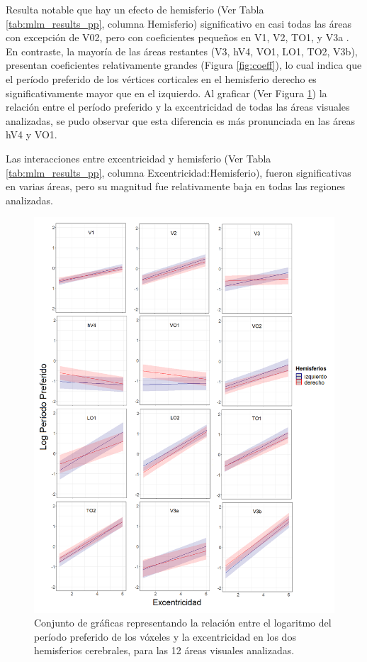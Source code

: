 Resulta notable que hay un efecto de hemisferio (Ver Tabla \ref{tab:mlm_results_pp}, columna Hemisferio) significativo en casi todas las áreas con excepción de V02, pero con coeficientes pequeños en V1, V2, TO1, y V3a . En contraste, la mayor\'ia de las \'areas restantes (V3, hV4, VO1, LO1, TO2, V3b), presentan coeficientes relativamente grandes (Figura \ref{fig:coeff}), lo cual indica que  el per\'iodo preferido de los v\'ertices corticales en el hemisferio derecho es significativamente mayor que en el izquierdo. Al graficar (Ver Figura \ref{fig:hem}) la relaci\'on entre el per\'iodo preferido y la excentricidad de todas las \'areas visuales analizadas, se pudo observar que esta diferencia es m\'as pronunciada en las \'areas hV4 y VO1. 

Las interacciones entre excentricidad y hemisferio (Ver Tabla \ref{tab:mlm_results_pp}, columna Excentricidad:Hemisferio), fueron significativas en varias áreas, pero su magnitud fue relativamente baja en todas las regiones analizadas.

\begin{figure}[h]
	\centering
	\includegraphics[scale=0.5]{Graphics/compuesto_rois_pp_vs_eccen_hem}
	\caption{Conjunto de gráficas representando la relación entre el logaritmo del per\'iodo preferido de los v\'oxeles y la excentricidad en los dos hemisferios cerebrales, para las 12 áreas visuales analizadas.}
	\label{fig:hem}
\end{figure}













